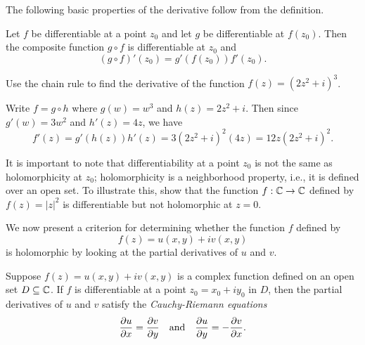 The following basic properties of the derivative follow from the definition.

\begin{theorem}%
    
\end{theorem}

\begin{theorem}
    Let \(f\) be differentiable at a point \(z_0\) and let \(g\) be differentiable at \(f(z_0)\). Then the composite function \(g \circ f\) is differentiable at \(z_0\) and
    \[
        (g \circ f)'(z_0) = g'(f(z_0))f'(z_0).
    \]
    \label{thm:chain-rule}
\end{theorem}

\begin{example}
    Use the chain rule to find the derivative of the function \(f(z) = (2z^2 + i)^3\).

    \begin{solution}
        Write \(f = g \circ h\) where \(g(w) = w^3\) and \(h(z) = 2z^2 + i\). Then since \(g'(w) = 3w^2\) and \(h'(z) = 4z\), we have
        \[
            f'(z) = g'(h(z))h'(z) = 3(2z^2 + i)^2(4z) = 12z(2z^2 + i)^2.
        \]
    \end{solution}
\end{example}


\begin{example}
    It is important to note that differentiability at a point \(z_0\) is not the same as holomorphicity at \(z_0\); holomorphicity is a neighborhood property, i.e., it is defined over an open set. To illustrate this, show that the function \(f: \mathbb{C} \to \mathbb{C}\) defined by \(f(z) = |z|^2\) is differentiable but not holomorphic at \(z = 0\).
\end{example}

We now present a criterion for determining whether the function \(f\) defined by
\[
    f(z) = u(x, y) + iv(x, y)
\]
is holomorphic by looking at the partial derivatives of \(u\) and \(v\).

\begin{theorem}
    \label{thm:cauchy-riemann}
    Suppose \(f(z) = u(x, y) + iv(x, y)\) is a complex function defined on an open set \(D \subseteq \mathbb{C}\). If \(f\) is differentiable at a point \(z_0 = x_0 + iy_0\) in \(D\), then the partial derivatives of \(u\) and \(v\) satisfy the \emph{Cauchy-Riemann equations}
    \begin{equation}
        \frac{\partial u}{\partial x} = \frac{\partial v}{\partial y} \quad \text{and} \quad \frac{\partial u}{\partial y} = -\frac{\partial v}{\partial x}.
        \label{eq:cauchy-riemann}
    \end{equation}
\end{theorem}

